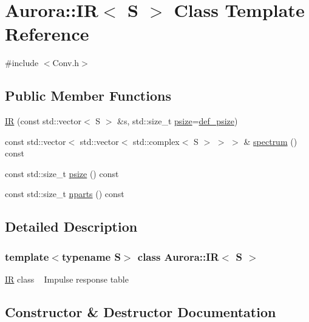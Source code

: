 \hypertarget{class_aurora_1_1_i_r}{}\section{Aurora\+:\+:IR$<$ S $>$ Class Template Reference}
\label{class_aurora_1_1_i_r}


{\ttfamily \#include $<$Conv.\+h$>$}

\subsection*{Public Member Functions}
\begin{DoxyCompactItemize}
\item 
\hyperlink{class_aurora_1_1_i_r_a2efce1ea1cacb440e68195209fb2e5e2}{IR} (const std\+::vector$<$ S $>$ \&s, std\+::size\+\_\+t \hyperlink{class_aurora_1_1_i_r_a6243d747aeccbe57b2e18cb34a806d70}{psize}=\hyperlink{namespace_aurora_a080d03c33477d9c6322278722ca8e472}{def\+\_\+psize})
\item 
const std\+::vector$<$ std\+::vector$<$ std\+::complex$<$ S $>$ $>$ $>$ \& \hyperlink{class_aurora_1_1_i_r_a2463850b1167583c7338025b204ed631}{spectrum} () const
\item 
const std\+::size\+\_\+t \hyperlink{class_aurora_1_1_i_r_a6243d747aeccbe57b2e18cb34a806d70}{psize} () const
\item 
const std\+::size\+\_\+t \hyperlink{class_aurora_1_1_i_r_a77d0fec4d82334a2f5533b4c8044c4e1}{nparts} () const
\end{DoxyCompactItemize}


\subsection{Detailed Description}
\subsubsection*{template$<$typename S$>$\newline
class Aurora\+::\+I\+R$<$ S $>$}

\hyperlink{class_aurora_1_1_i_r}{IR} class ~\newline
Impulse response table 

\subsection{Constructor \& Destructor Documentation}
\mbox{\label{class_aurora_1_1_i_r_a2efce1ea1cacb440e68195209fb2e5e2}} 
